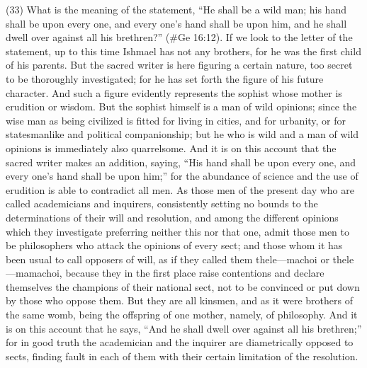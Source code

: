 (33) What is the meaning of the statement, ``He shall be a wild man; his hand shall be upon every
one, and every one's hand shall be upon him, and he shall dwell over against all his brethren?''
(\#Ge 16:12). If we look to the letter of the statement, up to this time Ishmael has not any
brothers, for he was the first child of his parents. But the sacred writer is here figuring a certain
nature, too secret to be thoroughly investigated; for he has set forth the figure of his future
character. And such a figure evidently represents the sophist whose mother is erudition or wisdom.
But the sophist himself is a man of wild opinions; since the wise man as being civilized is fitted for
living in cities, and for urbanity, or for statesmanlike and political companionship; but he who is wild
and a man of wild opinions is immediately also quarrelsome. And it is on this account that the
sacred writer makes an addition, saying, ``His hand shall be upon every one, and every one's hand
shall be upon him;'' for the abundance of science and the use of erudition is able to contradict all
men. As those men of the present day who are called academicians and inquirers, consistently
setting no bounds to the determinations of their will and resolution, and among the different
opinions which they investigate preferring neither this nor that one, admit those men to be
philosophers who attack the opinions of every sect; and those whom it has been usual to call
opposers of will, as if they called them thele—machoi or thele—mamachoi, because they in the first
place raise contentions and declare themselves the champions of their national sect, not to be
convinced or put down by those who oppose them. But they are all kinsmen, and as it were
brothers of the same womb, being the offspring of one mother, namely, of philosophy. And it is on
this account that he says, ``And he shall dwell over against all his brethren;'' for in good truth the
academician and the inquirer are diametrically opposed to sects, finding fault in each of them with
their certain limitation of the resolution.

